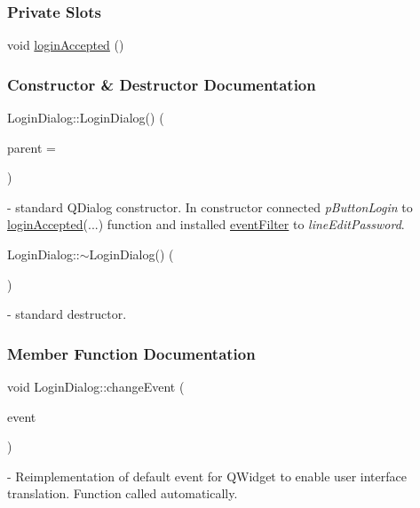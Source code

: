 \subsubsection*{Private Slots}
\begin{DoxyCompactItemize}
\item 
void \mbox{\hyperlink{classLoginDialog_a7e94645a64f9dd86f7e2bcd6f3dbf7fa}{login\+Accepted}} ()
\end{DoxyCompactItemize}


\subsubsection{Constructor \& Destructor Documentation}
\mbox{\label{classLoginDialog_af231bf82d3c72985f62bb47067255f47}} 
{\footnotesize\ttfamily Login\+Dialog\+::\texorpdfstring{Login\+Dialog()}{LoginDialog()} (\begin{DoxyParamCaption}\item[{Q\+Widget $\ast$}]{parent = {} }\end{DoxyParamCaption})\hspace{0.3cm}{\ttfamily [explicit]}} - standard Q\+Dialog constructor. In constructor connected \textit{p\+Button\+Login} to \hyperlink{classLoginDialog_a7e94645a64f9dd86f7e2bcd6f3dbf7fa}{login\+Accepted}(...) function and installed \hyperlink{classLoginDialog_a3c1b6041fc659f3f409e129a5c4a7944}{event\+Filter} to \textit{line\+Edit\+Password}.

\mbox{\label{classLoginDialog_aa5d012ebc424713ca0cbd82be1f81133}} 
{\footnotesize\ttfamily Login\+Dialog\+::\texorpdfstring{$\sim$\+Login\+Dialog()}{~LoginDialog()} (\begin{DoxyParamCaption}{ }\end{DoxyParamCaption})} - standard destructor.

\subsubsection{Member Function Documentation}
\mbox{\label{classLoginDialog_a1256114f012018b32b37086f567ffc81}} 
{\footnotesize\ttfamily void Login\+Dialog\+::\texorpdfstring{change\+Event}{changeEvent} (\begin{DoxyParamCaption}\item[{Q\+Event $\ast$}]{event }\end{DoxyParamCaption})\hspace{0.3cm}{\ttfamily [protected]}} - Reimplementation of default event for QWidget to enable user interface translation. Function called automatically.

